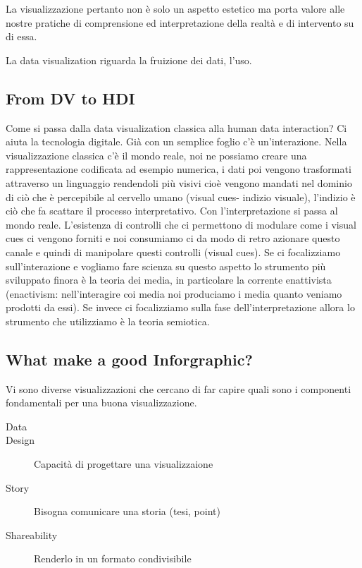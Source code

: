 \documentclass[12pt,a4paper]{report}
\begin{document}
La visualizzazione pertanto non è solo un aspetto estetico ma porta valore alle nostre pratiche di comprensione ed interpretazione della realtà e di intervento su di essa.

La data visualization riguarda la fruizione dei dati, l'uso. 

\subsection{From DV to HDI}
Come si passa dalla data visualization classica alla human data interaction? Ci aiuta la tecnologia digitale. Già con un semplice foglio c'è un'interazione. Nella visualizzazione classica c'è il mondo reale, noi ne possiamo creare una rappresentazione codificata ad esempio numerica, i dati poi vengono trasformati attraverso un linguaggio rendendoli più visivi cioè vengono mandati nel dominio di ciò che è percepibile al cervello umano (visual cues- indizio visuale), l'indizio è ciò che fa scattare il processo interpretativo. Con l'interpretazione si passa al mondo reale. L'esistenza di controlli che ci permettono di modulare come i visual cues ci vengono forniti e noi consumiamo  ci da modo di retro azionare questo canale e quindi di manipolare questi controlli (visual cues). Se ci focalizziamo sull'interazione e vogliamo fare scienza su questo aspetto lo strumento più sviluppato finora è la teoria dei media, in particolare la corrente enattivista (enactivism: nell'interagire coi media noi produciamo i media quanto veniamo prodotti da essi). Se invece ci focalizziamo sulla fase dell'interpretazione allora lo strumento che utilizziamo è la teoria semiotica. 

\subsection{What make a good Inforgraphic?}

Vi sono diverse visualizzazioni che cercano di far capire quali sono i componenti fondamentali per una buona visualizzazione. 

\begin{description}
	\item[Data] 
	\item[Design] Capacità di progettare una visualizzaione
	\item[Story] Bisogna comunicare una storia (tesi, point)
	\item [Shareability] Renderlo in un formato condivisibile
\end{description}
\end{document}
